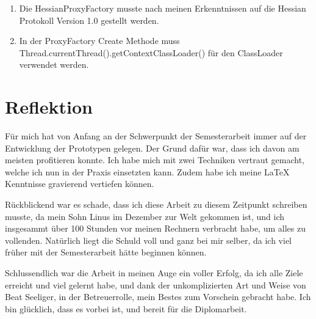 \documentclass[abstracton, listof=totocnumbered,
bibliography=totocnumbered]{scrreprt}
\begin{document}
  \begin{enumerate}
    \item Die HessianProxyFactory musste nach meinen Erkenntnissen auf die
    Hessian Protokoll Version 1.0 gestellt werden.
    \item In der ProxyFactory Create Methode muss
    Thread.currentThread().getContextClassLoader() für den ClassLoader
    verwendet werden.
  \end{enumerate}
  
  \chapter{Reflektion}

  Für mich hat von Anfang an der Schwerpunkt der Semesterarbeit immer auf der
  Entwicklung der Prototypen gelegen. Der Grund dafür war, dass ich davon am
  meisten profitieren konnte. Ich habe mich mit zwei Techniken vertraut gemacht,
  welche ich nun in der Praxis einsetzten kann. Zudem habe ich meine \LaTeX{}
  Kenntnisse gravierend vertiefen können.
  
  Rückblickend war es schade, dass ich diese Arbeit zu diesem Zeitpunkt
  schreiben musste, da mein Sohn Linus im Dezember zur Welt gekommen ist, und
  ich insgesammt über 100 Stunden vor meinen Rechnern verbracht habe, um alles
  zu vollenden. Natürlich liegt die Schuld voll und ganz bei mir selber, da ich
  viel früher mit der Semesterarbeit hätte beginnen können.
  
  Schlussendlich war die Arbeit in meinen Auge ein voller Erfolg, da ich alle
  Ziele erreicht und viel gelernt habe, und dank der unkomplizierten Art und Weise von
  Beat Seeliger, in der Betreuerrolle, mein Bestes zum Vorschein gebracht habe.
  Ich bin glücklich, dass es vorbei ist, und bereit für die Diplomarbeit.
  
  
  \appendix
  
%  
  
  
\end{document}
